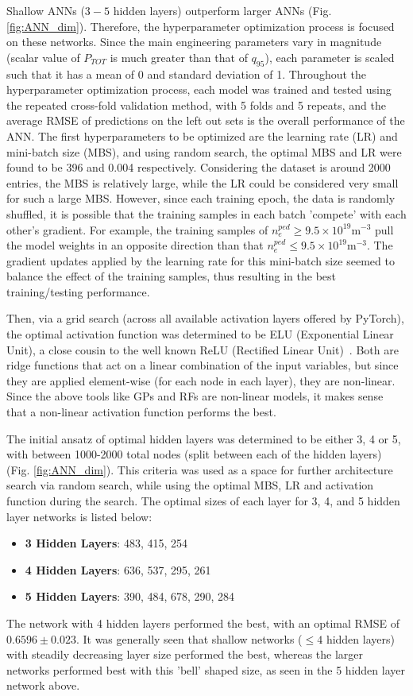 \documentclass[a4paper, twoside, final, 12pt]{article}
\begin{document}
{Shallow ANNs ($3-5$ hidden layers) outperform larger ANNs (Fig. \ref{fig:ANN_dim}). Therefore, the hyperparameter optimization process is focused on these networks. Since the main engineering parameters vary in magnitude (scalar value of $P_{TOT}$ is much greater than that of $q_{95}$), each parameter is scaled such that it has a mean of 0 and standard deviation of 1. Throughout the hyperparameter optimization process, each model was trained and tested using the repeated cross-fold validation method, with 5 folds and 5 repeats, and the average RMSE of predictions on the left out sets is the overall performance of the ANN. The first hyperparameters to be optimized are the learning rate (LR) and mini-batch size (MBS), and using random search, the optimal MBS and LR were found to be 396 and 0.004 respectively. Considering the dataset is around 2000 entries, the MBS is relatively large, while the LR could be considered very small for such a large MBS. However, since each training epoch, the data is randomly shuffled, it is possible that the training samples in each batch 'compete' with each other's gradient. For example, the training samples of $n_e^{ped} \geq 9.5 \times 10^{19}\text{m}^{-3}$ pull the model weights in an opposite direction than that $n_e^{ped} \leq 9.5 \times 10^{19}\text{m}^{-3}$. The gradient updates applied by the learning rate for this mini-batch size seemed to balance the effect of the training samples, thus resulting in the best training/testing performance. 

Then, via a grid search (across all available activation layers offered by PyTorch), the optimal activation function was determined to be ELU (Exponential Linear Unit), a close cousin to the well known ReLU (Rectified Linear Unit)~\cite{pytorch_act}. Both are ridge functions that act on a linear combination of the input variables, but since they are applied element-wise (for each node in each layer), they are non-linear. Since the above tools like GPs and RFs are non-linear models, it makes sense that a non-linear activation function performs the best. 

The initial ansatz of optimal hidden layers was determined to be either 3, 4 or 5, with between 1000-2000 total nodes (split between each of the hidden layers) (Fig. \ref{fig:ANN_dim}). This criteria was used as a space for further architecture search via random search, while using the optimal MBS, LR and activation function during the search. 
The optimal sizes of each layer for 3, 4, and 5 hidden layer networks is listed below: 
\begin{itemize}
	\item \textbf{3 Hidden Layers}: 483, 415, 254
	\item \textbf{4 Hidden Layers}: 636, 537, 295, 261
	\item \textbf{5 Hidden Layers}: 390, 484, 678, 290, 284
\end{itemize} 
The network with 4 hidden layers performed the best, with an optimal RMSE of $0.6596 \pm 0.023$. 
It was generally seen that shallow networks ($\leq 4$ hidden layers) with steadily decreasing layer size performed the best, whereas the larger networks performed best with this 'bell' shaped size, as seen in the 5 hidden layer network above. 

}
\end{document}
